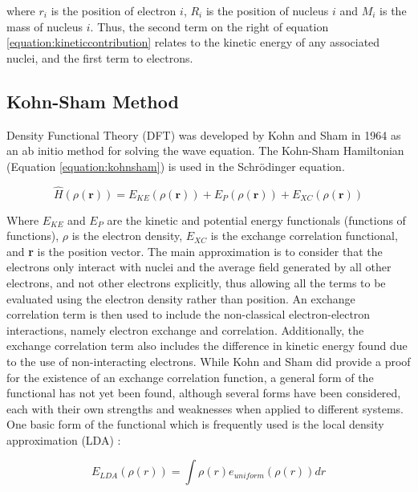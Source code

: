 where $r_{i}$ is the position of electron $i$, $R_{i}$ is the position of nucleus $i$ and $M_{i}$ is the mass of nucleus $i$. Thus, the second term on the right of equation \ref{equation:kineticcontribution} relates to the kinetic energy of any associated nuclei, and the first term to electrons.

\subsection{Kohn-Sham Method}

Density Functional Theory (DFT) was developed by Kohn and Sham in 1964 \cite{Kohn1965} as an ab initio method for solving the wave equation. The Kohn-Sham Hamiltonian (Equation \ref{equation:kohnsham}) is used in the Schr\"odinger equation.

\begin{equation}
\hat{H}(\rho(\textbf{r})) = E_{KE}(\rho(\textbf{r})) + E_{P}(\rho(\textbf{r})) + E_{XC}(\rho(\textbf{r}))
\label{equation:kohnsham}
\end{equation}

Where $E_{KE}$ and $E_{P}$ are the kinetic and potential energy functionals (functions of functions), $\rho$ is the electron density, $E_{XC}$ is the exchange correlation functional, and \textbf{r} is the position vector. The main approximation is to consider that the electrons only interact with nuclei and the average field generated by all other electrons, and not other electrons explicitly, thus allowing all the terms to be evaluated using the electron density rather than position. An exchange correlation term is then used to include the non-classical electron-electron interactions, namely electron exchange and correlation. Additionally, the exchange correlation term also includes the difference in kinetic energy found due to the use of non-interacting electrons. While Kohn and Sham did provide a proof for the existence of an exchange correlation function, a general form of the functional has not yet been found, although several forms have been considered, each with their own strengths and weaknesses when applied to different systems. One basic form of the functional which is frequently used is the local density approximation (LDA) \cite{Kohn1965}:

\begin{equation}
E_{LDA}(\rho(r)) = \int\rho(r)e_{uniform}(\rho(r))dr
\label{equation:LDA}
\end{equation}

